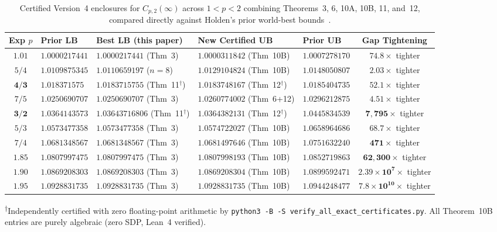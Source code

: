 \documentclass[10pt,letterpaper]{article}
\begin{document}
\begin{table}[htbp]
\centering
\caption{\small Certified Version~4 enclosures for $C_{p,2}(\infty)$ across $1 < p < 2$ combining Theorems~3, 6, 10A, 10B, 11, and~12, compared directly against Holden's prior world-best bounds~\cite{Holden2026b}.}
\vspace{3pt}
\footnotesize
\setlength{\tabcolsep}{3.6pt}
\begin{tabular}{@{}c l l l l c@{}}
\toprule
\textbf{Exp $p$} & \textbf{Prior LB} & \textbf{Best LB (this paper)} & \textbf{New Certified UB} & \textbf{Prior UB~\cite{Holden2026b}} & \textbf{Gap Tightening} \\
\midrule
$1.01$ & $1.0000217441$ & $1.0000217441$ (Thm~3) & $\mathbf{1.0000311842}$ (Thm~10B) & $1.0007278170$ & $\mathbf{74.8\times}$ tighter \\
$5/4$  & $1.0109875345$ & $1.0110659197$ ($n=8$) & $\mathbf{1.0129104824}$ (Thm~10B) & $1.0148050807$ & $\mathbf{2.03\times}$ tighter \\
$\mathbf{4/3}$ & $1.018371575$ & $\mathbf{1.0183715755}$ (Thm~11$^\dagger$) & $\mathbf{1.0183748167}$ (Thm~12$^\dagger$) & $1.0185404735$ & $\mathbf{52.1\times}$ tighter \\
$7/5$  & $1.0250690707$ & $1.0250690707$ (Thm~3) & $\mathbf{1.0260774002}$ (Thm~6+12) & $1.0296212875$ & $\mathbf{4.51\times}$ tighter \\
$\mathbf{3/2}$ & $1.0364143573$ & $\mathbf{1.03643716806}$ (Thm~11$^\dagger$) & $\mathbf{1.0364382131}$ (Thm~12$^\dagger$) & $1.0445834539$ & $\mathbf{7{,}795\times}$ tighter \\
$5/3$  & $1.0573477358$ & $1.0573477358$ (Thm~3) & $\mathbf{1.0574722027}$ (Thm~10B) & $1.0658964686$ & $\mathbf{68.7\times}$ tighter \\
$7/4$  & $1.0681348567$ & $1.0681348567$ (Thm~3) & $\mathbf{1.0681497646}$ (Thm~10B) & $1.0751632240$ & $\mathbf{471\times}$ tighter \\
$1.85$ & $1.0807997475$ & $1.0807997475$ (Thm~3) & $\mathbf{1.0807998193}$ (Thm~10B) & $1.0852719863$ & $\mathbf{62{,}300\times}$ tighter \\
$1.90$ & $1.0869208303$ & $1.0869208303$ (Thm~3) & $\mathbf{1.0869208304}$ (Thm~10B) & $1.0899592471$ & $\mathbf{2.39\times 10^7\times}$ tighter \\
$1.95$ & $1.0928831735$ & $1.0928831735$ (Thm~3) & $\mathbf{1.0928831735}$ (Thm~10B) & $1.0944248477$ & $\mathbf{7.8\times 10^{10}\times}$ tighter \\
\bottomrule
\end{tabular}
\vspace{4pt}
\par\parbox{0.96\textwidth}{\footnotesize\textsuperscript{$\dagger$}Independently certified with zero floating-point arithmetic by \texttt{python3 -B -S verify\_all\_exact\_certificates.py}. All Theorem~10B entries are purely algebraic (zero SDP, Lean~4 verified).}
\label{tab:enclosures}
\end{table}
\end{document}
